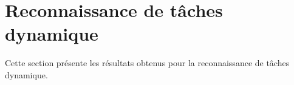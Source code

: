 \section{Reconnaissance de t\^aches dynamique}
\label{chap:basics:sec:recoDyn}

Cette section pr\'esente les r\'esultats obtenus
pour la reconnaissance de t\^aches dynamique.

